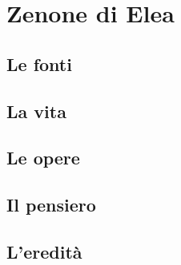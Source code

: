 \chapter{Zenone di Elea}

\section{Le fonti}

\section{La vita}

\section{Le opere}

\section{Il pensiero}

\section{L'eredità}
